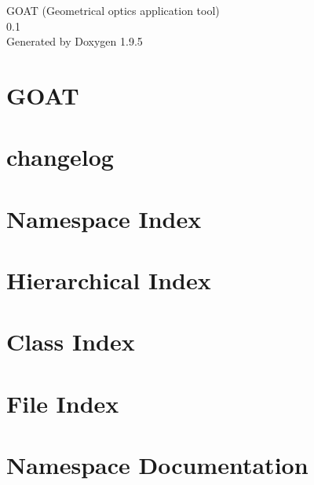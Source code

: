 \documentclass[twoside]{book}
\newcommand{\+}{\discretionary{\mbox{\scriptsize$\hookleftarrow$}}{}{}}
\newcommand{\clearemptydoublepage}{%
    \newpage{\pagestyle{empty}\cleardoublepage}%
  }
\begin{document}
  \raggedbottom
    \hypersetup{pageanchor=false,
                bookmarksnumbered=true,
                pdfencoding=unicode
               }
  \begin{titlepage}
  \vspace*{7cm}
  \begin{center}%
  {\Large GOAT (\+Geometrical optics application tool)}\\
  [1ex]\large 0.\+1 \\
  \vspace*{1cm}
  {\large Generated by Doxygen 1.9.5}\\
  \end{center}
  \end{titlepage}
  \clearemptydoublepage
  \tableofcontents
  \clearemptydoublepage
  \hypersetup{pageanchor=true}
\chapter{GOAT}
\label{index}\hypertarget{index}{}
\chapter{changelog}
\label{md_changelog}

\chapter{Namespace Index}

\chapter{Hierarchical Index}

\chapter{Class Index}

\chapter{File Index}

\chapter{Namespace Documentation}





\end{document}
